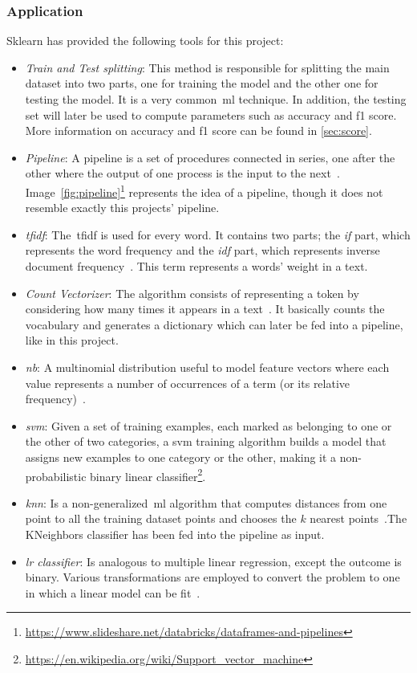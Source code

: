 \subsubsection{Application}
Sklearn has provided the following tools for this project:
\begin{itemize}
	\item \textit{Train and Test splitting}: This method is responsible for splitting the main dataset into two parts, one for training the model and the other one for testing the model. It is a very common~\ac{ml} technique. In addition, the testing set will later be used to compute parameters such as accuracy and f1 score. More information on accuracy and f1 score can be found in \cref{sec:score}.
	\item \textit{Pipeline}: A pipeline is a set of procedures connected in series, one after the other where the output of one process is the input to the next~\cite{pipeline1}. Image~\ref{fig:pipeline}\footnote{\url{https://www.slideshare.net/databricks/dataframes-and-pipelines}} represents the idea of a pipeline, though it does not resemble exactly this projects' pipeline.
	\item \textit{\acl{tfidf}}: The~\acf{tfidf} is used for every word. It contains two parts; the \textit{if} part, which represents the word frequency and the \textit{idf} part, which represents inverse document frequency~\cite{tfidf1}. This term represents a words' weight in a text.
	\item \textit{Count Vectorizer}: The algorithm consists of representing a token by considering how many times it appears in a text~\cite{countvect1}. It basically counts the vocabulary and generates a dictionary which can later be fed into a pipeline, like in this project.
	\item \textit{\acl{nb}}: A multinomial distribution useful to model feature vectors where each value represents a number of occurrences of a term (or its relative frequency)~\cite{countvect1}.
	\item \textit{\acl{svm}}: Given a set of training examples, each marked as belonging to one or the other of two categories, a \acf{svm} training algorithm builds a model that assigns new examples to one category or the other, making it a non-probabilistic binary linear classifier\footnote{\url{https://en.wikipedia.org/wiki/Support_vector_machine}}.
	\item \textit{\acl{knn}}: Is a non-generalized~\ac{ml} algorithm that computes distances from one point to all the training dataset points and chooses the $k$ nearest points~\cite{countvect1}.The KNeighbors classifier has been fed into the pipeline as input.
	\item \textit{\acl{lr} classifier}: Is analogous to multiple linear regression, except the outcome is binary. Various transformations are employed to convert the problem to one in which a linear model can be fit~\cite{lr1}.
\end{itemize}

